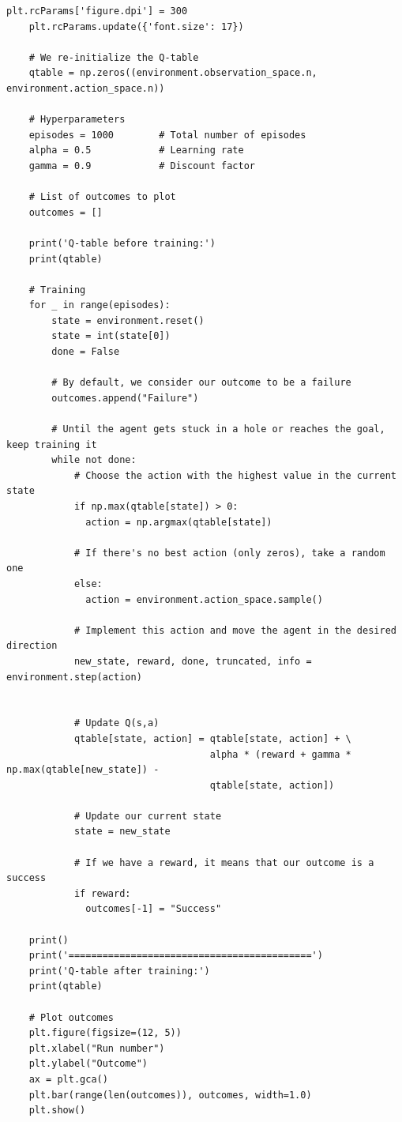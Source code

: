 \documentclass{article}
\begin{document}
\begin{lstlisting}[style=mystyle]
    plt.rcParams['figure.dpi'] = 300
    plt.rcParams.update({'font.size': 17})
    
    # We re-initialize the Q-table
    qtable = np.zeros((environment.observation_space.n, environment.action_space.n))
    
    # Hyperparameters
    episodes = 1000        # Total number of episodes
    alpha = 0.5            # Learning rate
    gamma = 0.9            # Discount factor
    
    # List of outcomes to plot
    outcomes = []
    
    print('Q-table before training:')
    print(qtable)
    
    # Training
    for _ in range(episodes):
        state = environment.reset()
        state = int(state[0])
        done = False
    
        # By default, we consider our outcome to be a failure
        outcomes.append("Failure")
    
        # Until the agent gets stuck in a hole or reaches the goal, keep training it
        while not done:
            # Choose the action with the highest value in the current state
            if np.max(qtable[state]) > 0:
              action = np.argmax(qtable[state])
    
            # If there's no best action (only zeros), take a random one
            else:
              action = environment.action_space.sample()        
        
            # Implement this action and move the agent in the desired direction
            new_state, reward, done, truncated, info = environment.step(action)
    
    
            # Update Q(s,a)
            qtable[state, action] = qtable[state, action] + \
                                    alpha * (reward + gamma * np.max(qtable[new_state]) - 
                                    qtable[state, action])
                 
            # Update our current state
            state = new_state
    
            # If we have a reward, it means that our outcome is a success
            if reward:
              outcomes[-1] = "Success"
    
    print()
    print('===========================================')
    print('Q-table after training:')
    print(qtable)
    
    # Plot outcomes
    plt.figure(figsize=(12, 5))
    plt.xlabel("Run number")
    plt.ylabel("Outcome")
    ax = plt.gca()
    plt.bar(range(len(outcomes)), outcomes, width=1.0)
    plt.show()    
\end{lstlisting}
\end{document}
